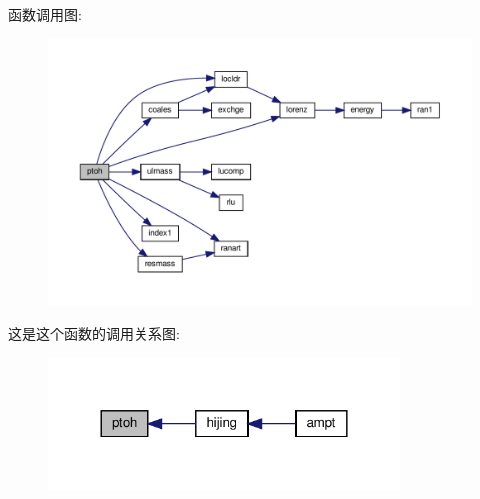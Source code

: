 函数调用图\+:
\nopagebreak
\begin{figure}[H]
\begin{center}
\leavevmode
\includegraphics[width=350pt]{ptoh_8f90_a3875378e6075d8676bc8df9e42b22386_cgraph}
\end{center}
\end{figure}
这是这个函数的调用关系图\+:
\nopagebreak
\begin{figure}[H]
\begin{center}
\leavevmode
\includegraphics[width=264pt]{ptoh_8f90_a3875378e6075d8676bc8df9e42b22386_icgraph}
\end{center}
\end{figure}
